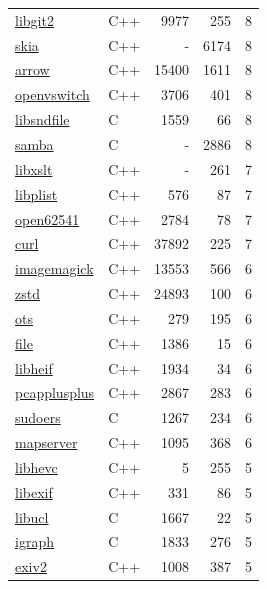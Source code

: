 \begin{table}[p]
\begin{minipage}[t]{.32\textwidth}
{\begin{tabular}[t]{@{}llrrr@{}}
\href{https://libgit2.github.com/}{libgit2} & C++ & 9977 & 255 & 8 \\
\href{https://github.com/google/skia}{skia} & C++ & - & 6174 & 8 \\
\href{https://arrow.apache.org/}{arrow} & C++ & 15400 & 1611 & 8 \\
\href{http://www.openvswitch.org}{openvswitch} & C++ & 3706 & 401 & 8 \\
\href{https://github.com/libsndfile/libsndfile}{libsndfile} & C & 1559 & 66 & 8 \\
\href{https://samba.org}{samba} & C & - & 2886 & 8 \\
\href{http://www.xmlsoft.org/libxslt/}{libxslt} & C++ & - & 261 & 7 \\
\href{https://github.com/libimobiledevice/libplist}{libplist} & C++ & 576 & 87 & 7 \\
\href{https://open62541.org/}{open62541} & C++ & 2784 & 78 & 7 \\
\href{https://curl.haxx.se/}{curl} & C++ & 37892 & 225 & 7 \\
\href{https://www.imagemagick.org}{imagemagick} & C++ & 13553 & 566 & 6 \\
\href{http://facebook.github.io/zstd/}{zstd} & C++ & 24893 & 100 & 6 \\
\href{https://github.com/khaledhosny/ots}{ots} & C++ & 279 & 195 & 6 \\
\href{http://www.darwinsys.com/file/}{file} & C++ & 1386 & 15 & 6 \\
\href{https://github.com/strukturag/libheif}{libheif} & C++ & 1934 & 34 & 6 \\
\href{https://github.com/seladb/PcapPlusPlus}{pcapplusplus} & C++ & 2867 & 283 & 6 \\
\href{https://github.com/sudo-project}{sudoers} & C & 1267 & 234 & 6 \\
\href{https://mapserver.org}{mapserver} & C++ & 1095 & 368 & 6 \\
\href{https://github.com/ittiam-systems/libhevc}{libhevc} & C++ & 5 & 255 & 5 \\
\href{https://libexif.github.io}{libexif} & C++ & 331 & 86 & 5 \\
\href{https://github.com/vstakhov/libucl}{libucl} & C & 1667 & 22 & 5 \\
\href{https://github.com/igraph/igraph}{igraph} & C & 1833 & 276 & 5 \\
\href{https://www.exiv2.org}{exiv2} & C++ & 1008 & 387 & 5 \\


\end{tabular}}
\end{minipage}
\end{table}
